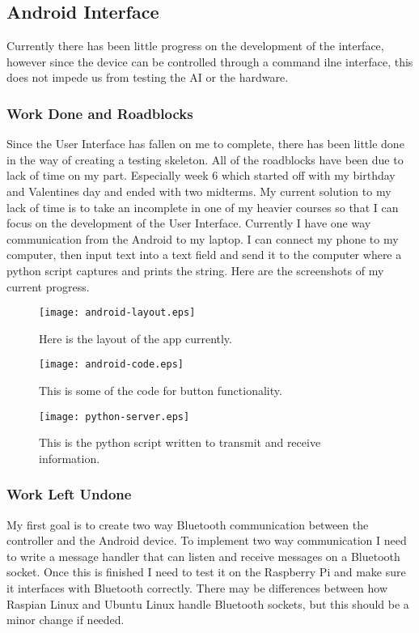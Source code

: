 \documentclass[draftclsnofoot,onecolumn,letterpaper,10pt]{IEEEtran}
\begin{document}
\subsection{Android Interface}
Currently there has been little progress on the development of the interface, however since the device can be controlled through a command ilne interface, this does not impede us from testing the AI or the hardware.


\subsubsection{Work Done and Roadblocks}
Since the User Interface has fallen on me to complete, there has been little done in the way of creating a testing skeleton.
All of the roadblocks have been due to lack of time on my part. Especially week 6 which started off with my birthday
and Valentines day and ended with two midterms.
My current solution to my lack of time is to take an incomplete in one of my heavier courses so that I can focus on the development of the User Interface.
Currently I have one way communication from the Android to my laptop. I can connect my phone to my 
computer, then input text into a text field and send it to the computer where a python script captures and prints the string.
Here are the screenshots of my current progress.

\newpage
\vfill

\begin{figure}
\label{fig:layout}
\caption{Here is the layout of the app currently.}
\texttt{[image: android-layout.eps]}
\end{figure}


\begin{figure}
\label{fig:code}
\caption{This is some of the code for button functionality.}
\texttt{[image: android-code.eps]}
\end{figure}


\begin{figure}
\label{fig:python}
\caption{This is the python script written to transmit and receive information.}
\texttt{[image: python-server.eps]}
\end{figure}

\vfill
\clearpage
\subsubsection{Work Left Undone}
My first goal is to create two way Bluetooth communication between the controller and the Android device.
To implement two way communication I need to write a message handler that can listen and receive messages on a Bluetooth socket. 
Once this is finished I need to test it on the Raspberry Pi and make sure it interfaces with Bluetooth correctly.
There may be differences between how Raspian Linux and Ubuntu Linux handle Bluetooth sockets, but this should be 
a minor change if needed.
\end{document}
